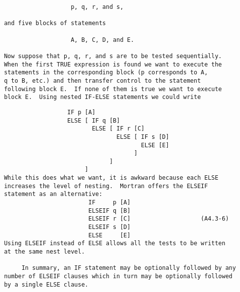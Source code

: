 \begin{verbatim}
                    p, q, r, and s,

 and five blocks of statements

                    A, B, C, D, and E.

 Now suppose that p, q, r, and s are to be tested sequentially.
 When the first TRUE expression is found we want to execute the
 statements in the corresponding block (p corresponds to A,
 q to B, etc.) and then transfer control to the statement
 following block E.  If none of them is true we want to execute
 block E.  Using nested IF-ELSE statements we could write
 \end{verbatim}
\newpage
 \begin{verbatim}
                   IF p [A]
                   ELSE [ IF q [B]
                          ELSE [ IF r [C]
                                 ELSE [ IF s [D]
                                        ELSE [E]
                                      ]
                               ]
                        ]
 While this does what we want, it is awkward because each ELSE
 increases the level of nesting.  Mortran offers the ELSEIF
 statement as an alternative:
                         IF     p [A]
                         ELSEIF q [B]
                         ELSEIF r [C]                    (A4.3-6)
                         ELSEIF s [D]
                         ELSE     [E]
 Using ELSEIF instead of ELSE allows all the tests to be written
 at the same nest level.

      In summary, an IF statement may be optionally followed by any
 number of ELSEIF clauses which in turn may be optionally followed
 by a single ELSE clause.
 \end{verbatim}
